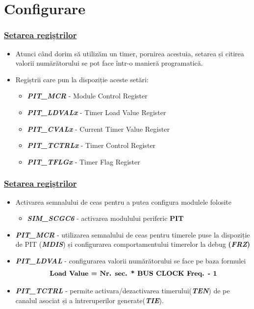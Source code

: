 \documentclass[xcolor={table}]{beamer}
\begin{document}
	\section{Configurare}
	\begin{frame}
	    \frametitle{\href{https://github.com/undacmic/MCULabs/blob/main/Resurse/FRDM-KL25Z_ReferenceManual.pdf}{Setarea regiștrilor}}
	    \begin{itemize}
	        \item Atunci când dorim să utilizăm un timer, pornirea acestuia, setarea și citirea valorii numărătorului se pot face într-o manieră programatică. 
	        \item Regiștrii care pun la dispoziție aceste setări:
	        \begin{itemize}
	            \item \textbf{\textit{PIT\_MCR}} - Module Control Register
	            \item \textbf{\textit{PIT\_LDVALx}} - Timer Load Value Register 
	            \item \textbf{\textit{PIT\_CVALx}} - Current Timer Value Register
	            \item \textbf{\textit{PIT\_TCTRLx}} - Timer Control Register
	            \item \textbf{\textit{PIT\_TFLGx}} - Timer Flag Register
	        \end{itemize}
	    \end{itemize}
	\end{frame}
		\begin{frame}
	    \frametitle{\href{https://github.com/undacmic/MCULabs/blob/main/Resurse/FRDM-KL25Z_ReferenceManual.pdf}{Setarea regiștrilor}}
	    \begin{itemize}
	        \item Activarea semnalului de ceas pentru a putea configura modulele folosite
	        \begin{itemize}
	            \item \textbf{\textit{SIM\_SCGC6}} - activarea modulului periferic \textbf{PIT}
	        \end{itemize}
	        \item \textbf{\textit{PIT\_MCR}} - utilizarea semnalului de ceas pentru timerele puse la dispoziție de PIT (\textbf{\textit{MDIS}}) și configurarea comportamentului timerelor la debug \textbf{(\textit{FRZ})}
	        \item \textbf{\textit{PIT\_LDVAL}} - configurarea valorii numărătorului se face pe baza formulei
	        \begin{align*}
	            \text{\textbf{Load Value = Nr. sec. * BUS CLOCK Freq. - 1}}
	        \end{align*}
	        \item \textbf{\textit{PIT\_TCTRL}} - permite activara/dezactivarea timerului(\textbf{\textit{TEN}}) de pe canalul asociat și a întreruperilor generate(\textbf{\textit{TIE}}).
	    \end{itemize}
	\end{frame}
\end{document}
